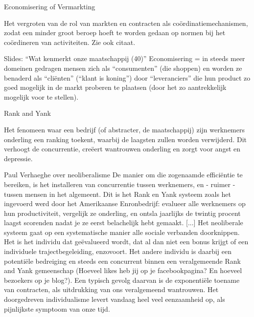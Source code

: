 \documentclass[main.tex]{subfiles}
\begin{document}
\begin{examenvraag}
    \begin{vraag}
        Economisering of Vermarkting
    \end{vraag}

    \begin{antwoord}
        Het vergroten van de rol van markten en contracten als co\"ordinatiemechanismen, zodat een minder groot beroep hoeft te worden gedaan op normen bij het co\"ordineren van activiteiten. Zie ook citaat.
        \begin{citaat}{Slides: ``Wat kenmerkt onze maatschappij (40)''}
            Economisering = in steeds meer domeinen gedragen mensen zich als “consumenten” (die shoppen) en worden ze benaderd als “cliënten” (“klant is koning”) door “leveranciers” die hun product zo goed mogelijk in de markt proberen te plaatsen (door het zo aantrekkelijk mogelijk voor te stellen).
        \end{citaat}
    \end{antwoord}
\end{examenvraag}

\begin{examenvraag}
    \begin{vraag}
        Rank and Yank
    \end{vraag}

    \begin{antwoord}
        Het fenomeen waar een bedrijf (of abstracter, de maatschappij) zijn werknemers onderling een ranking toekent, waarbij de laagsten zullen worden verwijderd.
        Dit verhoogt de concurrentie, cre\"eert wantrouwen onderling en zorgt voor angst en depressie.
        \begin{citaat}{Paul Verhaeghe over neoliberalisme}
            De manier om die zogenaamde effici\"entie te bereiken, is het installeren van concurrentie tussen werknemers, en - ruimer - tussen mensen in het algemeent.
            Dit is het Rank en Yank systeem zoals het ingevoerd werd door het Amerikaanse Enronbedrijf: evalueer alle werknemers op hun productiviteit, vergelijk ze onderling, en ontsla jaarlijks de twintig procent laagst scorenden nadat je ze eerst belachelijk hebt gemaakt.
            [...]
            Het neoliberale systeem gaat op een systematische manier alle sociale verbanden doorknippen.
            Het is het individu dat ge\"evalueerd wordt,  dat  al  dan  niet  een  bonus  krijgt  of  een  individuele  trajectbegeleiding,  enzovoort.
            Het  andere individu is daarbij een potentiële bedreiging en steeds een concurrent binnen een veralgemeende Rank and Yank gemeenschap (Hoeveel likes heb jij op je facebookpagina? En hoeveel bezoekers op je blog?).
            Een typisch gevolg daarvan is de exponenti\"ele toename van contracten, als uitdrukking van ons veralgemeend wantrouwen. Het doorgedreven individualisme levert vandaag heel veel eenzaamheid op, als pijnlijkste symptoom van onze tijd.
        \end{citaat}
    \end{antwoord}
\end{examenvraag}
\end{document}
